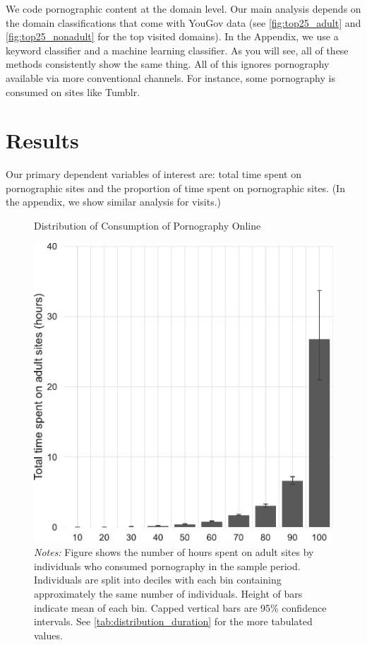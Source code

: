 \documentclass[12pt, letterpaper]{article}
\begin{document}
We code pornographic content at the domain level. Our main analysis depends on the domain classifications that come with YouGov data (see \cref{fig:top25_adult} and \cref{fig:top25_nonadult} for the top visited domains). In the Appendix, we use a keyword classifier and a machine learning classifier. As you will see, all of these methods consistently show the same thing. All of this ignores pornography available via more conventional channels. For instance, some pornography is consumed on sites like Tumblr.

\FloatBarrier
\section*{Results}

Our primary dependent variables of interest are: total time spent on pornographic sites and the proportion of time spent on pornographic sites. (In the appendix, we show similar analysis for visits.) 


\begin{figure}[ht]
\centering
\caption{Distribution of Consumption of Pornography Online}
\includegraphics[width=.5\linewidth]{../figs/distribution_duration_on_adultsites.pdf}
\caption*{\footnotesize \emph{Notes:} 
	Figure shows the number of hours spent on adult sites by individuals who consumed pornography in the sample period.
	Individuals are split into deciles with each bin containing approximately the same number of individuals.
	Height of bars indicate mean of each bin.
	Capped vertical bars are 95\% confidence intervals.
	See \cref{tab:distribution_duration} for the more tabulated values.
}
\label{fig:distribution_duration}
\end{figure}
\end{document}
